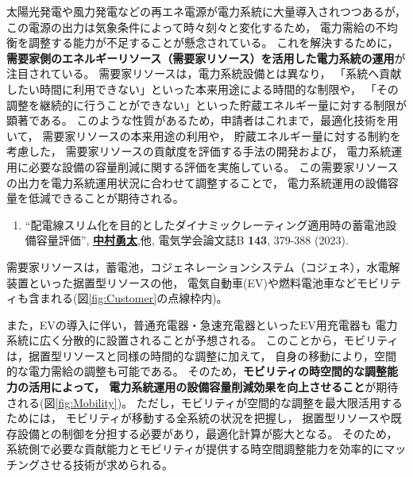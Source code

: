\documentclass[11pt,a4paper,uplatex,dvipdfmx]{ujarticle} 		%
\newcommand{\研究課題名}{モビリティの時空間調整を活用した電力設備形成構築}
\newcommand{\研究機関名}{名古屋工業大学}
\newcommand{\研究代表者氏名}{中村勇太}
\newcommand{\研究期間の最終元号年度}{10}  %
\newcommand{\paper}[6]{%
	\item ``#1'', #2, #3 {\bf #4}, #5 (#6).			%
}
\begin{document}
太陽光発電や風力発電などの再エネ電源が電力系統に大量導入されつつあるが，
この電源の出力は気象条件によって時々刻々と変化するため，%
電力需給の不均衡を調整する能力が不足することが懸念されている。
これを解決するために，
\textbf{需要家側のエネルギーリソース（需要家リソース）を活用した電力系統の運用}が注目されている。
需要家リソースは，電力系統設備とは異なり，
「系統へ貢献したい時間に利用できない」といった本来用途による時間的な制限や，
「その調整を継続的に行うことができない」といった貯蔵エネルギー量に対する制限が顕著である。
このような性質があるため，申請者はこれまで，最適化技術を用いて，
需要家リソースの本来用途の利用や，
貯蔵エネルギー量に対する制約を考慮した，
需要家リソースの貢献度を評価する手法の開発および，
電力系統運用に必要な設備の容量削減に関する評価を実施している。
この需要家リソースの出力を電力系統運用状況に合わせて調整することで，
電力系統運用の設備容量を低減できることが期待される。

\begin{enumerate}
	\setlength{\itemsep}{-5pt}	
	\paper{配電線スリム化を目的としたダイナミックレーティング適用時の蓄電池設備容量評価}{\textbf{\ul{中村勇太}},他}{電気学会論文誌B}{143}{379-388}{2023}\label{pub:slim_by_bat}
\end{enumerate}


需要家リソースは，蓄電池，コジェネレーションシステム（コジェネ），水電解装置といった据置型リソースの他，
電気自動車(EV)や燃料電池車などモビリティも含まれる(図\ref{fig:Customer}の点線枠内)。



また，EVの導入に伴い，普通充電器・急速充電器といったEV用充電器も
電力系統に広く分散的に設置されることが予想される。
このことから，モビリティは，据置型リソースと同様の時間的な調整に加えて，
自身の移動により，空間的な電力需給の調整も可能である。
そのため，\textbf{モビリティの時空間的な調整能力の活用によって，
電力系統運用の設備容量削減効果を向上させること}が期待される(図\ref{fig:Mobility})。
ただし，モビリティが空間的な調整を最大限活用するためには，
モビリティが移動する全系統の状況を把握し，
据置型リソースや既存設備との制御を分担する必要があり，最適化計算が膨大となる。
そのため，系統側で必要な貢献能力とモビリティが提供する時空間調整能力を効率的にマッチングさせる技術が求められる。
\end{document}
